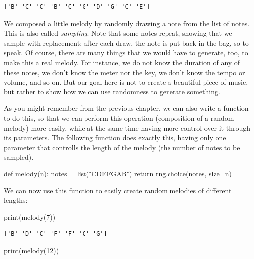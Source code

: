 \documentclass[
  a4paperpaper,
  ,captions=tableheading
]{scrbook}
\newenvironment{Shaded}{\begin{snugshade}}{\end{snugshade}}
\newcommand{\BuiltInTok}[1]{\textcolor[rgb]{0.00,0.23,0.31}{#1}}
\newcommand{\ControlFlowTok}[1]{\textcolor[rgb]{0.00,0.23,0.31}{#1}}
\newcommand{\DecValTok}[1]{\textcolor[rgb]{0.68,0.00,0.00}{#1}}
\newcommand{\KeywordTok}[1]{\textcolor[rgb]{0.00,0.23,0.31}{#1}}
\newcommand{\NormalTok}[1]{\textcolor[rgb]{0.00,0.23,0.31}{#1}}
\newcommand{\OperatorTok}[1]{\textcolor[rgb]{0.37,0.37,0.37}{#1}}
\newcommand{\StringTok}[1]{\textcolor[rgb]{0.13,0.47,0.30}{#1}}
\begin{document}
\begin{verbatim}
['B' 'C' 'C' 'B' 'C' 'G' 'D' 'G' 'C' 'E'] 
\end{verbatim}

We composed a little melody by randomly drawing a note from the list of
notes. This is also called \emph{sampling}. Note that some notes repeat,
showing that we sample with replacement: after each draw, the note is
put back in the bag, so to speak. Of course, there are many things that
we would have to generate, too, to make this a real melody. For
instance, we do not know the duration of any of these notes, we don't
know the meter nor the key, we don't know the tempo or volume, and so
on. But our goal here is not to create a beautiful piece of music, but
rather to show how we can use randomness to generate something.

As you might remember from the previous chapter, we can also write a
function to do this, so that we can perform this operation (composition
of a random melody) more easily, while at the same time having more
control over it through its parameters. The following function does
exactly this, having only one parameter that controlls the length of the
melody (the number of notes to be sampled).

\begin{Shaded}
\begin{Highlighting}[]
\KeywordTok{def}\NormalTok{ melody(n):}
\NormalTok{    notes }\OperatorTok{=} \BuiltInTok{list}\NormalTok{(}\StringTok{"CDEFGAB"}\NormalTok{)}
    \ControlFlowTok{return}\NormalTok{ rng.choice(notes, size}\OperatorTok{=}\NormalTok{n)}
\end{Highlighting}
\end{Shaded}

We can now use this function to easily create random melodies of
different lengths:

\begin{Shaded}
\begin{Highlighting}[]
\BuiltInTok{print}\NormalTok{(melody(}\DecValTok{7}\NormalTok{))}
\end{Highlighting}
\end{Shaded}

\begin{verbatim}
['B' 'D' 'C' 'F' 'F' 'C' 'G']
\end{verbatim}

\begin{Shaded}
\begin{Highlighting}[]
\BuiltInTok{print}\NormalTok{(melody(}\DecValTok{12}\NormalTok{))}
\end{Highlighting}
\end{Shaded}
\end{document}
